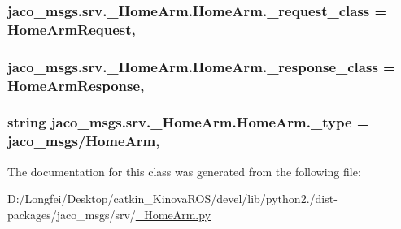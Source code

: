 \subsubsection[{\texorpdfstring{\+\_\+request\+\_\+class}{_request_class}}]{\setlength{\rightskip}{0pt plus 5cm}jaco\+\_\+msgs.\+srv.\+\_\+\+Home\+Arm.\+Home\+Arm.\+\_\+request\+\_\+class = {\bf Home\+Arm\+Request}\hspace{0.3cm}{\ttfamily [static]}, {\ttfamily [private]}}\hypertarget{classjaco__msgs_1_1srv_1_1__HomeArm_1_1HomeArm_a7fa586c9db23a0b867b3f65f5077e15b}{}\label{classjaco__msgs_1_1srv_1_1__HomeArm_1_1HomeArm_a7fa586c9db23a0b867b3f65f5077e15b}
\subsubsection[{\texorpdfstring{\+\_\+response\+\_\+class}{_response_class}}]{\setlength{\rightskip}{0pt plus 5cm}jaco\+\_\+msgs.\+srv.\+\_\+\+Home\+Arm.\+Home\+Arm.\+\_\+response\+\_\+class = {\bf Home\+Arm\+Response}\hspace{0.3cm}{\ttfamily [static]}, {\ttfamily [private]}}\hypertarget{classjaco__msgs_1_1srv_1_1__HomeArm_1_1HomeArm_a73d2e1a1451c2e1397b41e632843c191}{}\label{classjaco__msgs_1_1srv_1_1__HomeArm_1_1HomeArm_a73d2e1a1451c2e1397b41e632843c191}
\subsubsection[{\texorpdfstring{\+\_\+type}{_type}}]{\setlength{\rightskip}{0pt plus 5cm}string jaco\+\_\+msgs.\+srv.\+\_\+\+Home\+Arm.\+Home\+Arm.\+\_\+type = \textquotesingle{}jaco\+\_\+msgs/{\bf Home\+Arm}\textquotesingle{}\hspace{0.3cm}{\ttfamily [static]}, {\ttfamily [private]}}\hypertarget{classjaco__msgs_1_1srv_1_1__HomeArm_1_1HomeArm_ad6f6260f6714fdf91c51b9583a8629a7}{}\label{classjaco__msgs_1_1srv_1_1__HomeArm_1_1HomeArm_ad6f6260f6714fdf91c51b9583a8629a7}


The documentation for this class was generated from the following file\+:\begin{DoxyCompactItemize}
\item 
D\+:/\+Longfei/\+Desktop/catkin\+\_\+\+Kinova\+R\+O\+S/devel/lib/python2./dist-\/packages/jaco\+\_\+msgs/srv/\hyperlink{__HomeArm_8py}{\+\_\+\+Home\+Arm.\+py}\end{DoxyCompactItemize}
